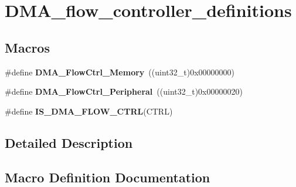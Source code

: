 \hypertarget{group___d_m_a__flow__controller__definitions}{}\section{D\+M\+A\+\_\+flow\+\_\+controller\+\_\+definitions}
\label{group___d_m_a__flow__controller__definitions}
\subsection*{Macros}
\begin{DoxyCompactItemize}
\item 
\hypertarget{group___d_m_a__flow__controller__definitions_gafe69109789c2c285f98193f4b598cbc1}{}\#define {\bfseries D\+M\+A\+\_\+\+Flow\+Ctrl\+\_\+\+Memory}~((uint32\+\_\+t)0x00000000)\label{group___d_m_a__flow__controller__definitions_gafe69109789c2c285f98193f4b598cbc1}

\item 
\hypertarget{group___d_m_a__flow__controller__definitions_ga33a735d51a2b790a25c579753edddd46}{}\#define {\bfseries D\+M\+A\+\_\+\+Flow\+Ctrl\+\_\+\+Peripheral}~((uint32\+\_\+t)0x00000020)\label{group___d_m_a__flow__controller__definitions_ga33a735d51a2b790a25c579753edddd46}

\item 
\#define {\bfseries I\+S\+\_\+\+D\+M\+A\+\_\+\+F\+L\+O\+W\+\_\+\+C\+T\+R\+L}(C\+T\+R\+L)
\end{DoxyCompactItemize}


\subsection{Detailed Description}


\subsection{Macro Definition Documentation}
\hypertarget{group___d_m_a__flow__controller__definitions_ga78c0f18c0a86c67510f540a4210aadb7}{}
